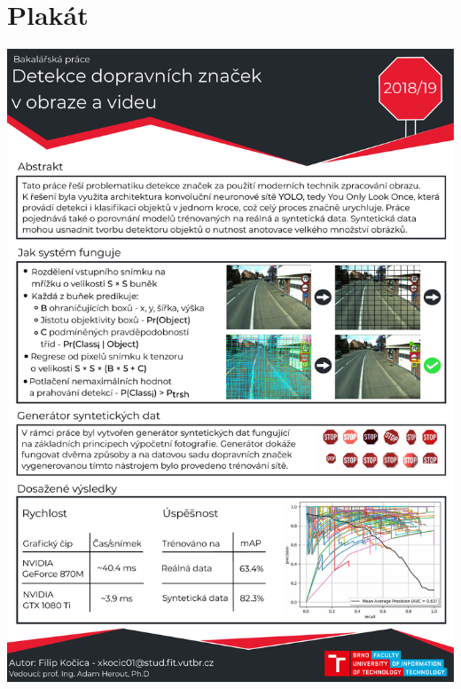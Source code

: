\chapter{Plakát}
\begin{center}
    \includegraphics[width=0.75\linewidth]{figures/prilohy/poster.pdf}
\end{center}
